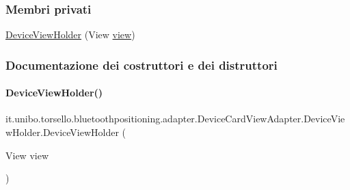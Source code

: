 \subsubsection*{Membri privati}
\begin{DoxyCompactItemize}
\item 
\hyperlink{classit_1_1unibo_1_1torsello_1_1bluetoothpositioning_1_1adapter_1_1DeviceCardViewAdapter_1_1DeviceViewHolder_a75016d2a0df1fc991a5a6aed86b776d2_a75016d2a0df1fc991a5a6aed86b776d2}{Device\+View\+Holder} (View \hyperlink{classit_1_1unibo_1_1torsello_1_1bluetoothpositioning_1_1adapter_1_1DeviceCardViewAdapter_1_1DeviceViewHolder_a4aa2da965bbcbc091ae913aea1e0a5cd_a4aa2da965bbcbc091ae913aea1e0a5cd}{view})
\end{DoxyCompactItemize}


\subsubsection{Documentazione dei costruttori e dei distruttori}
\hypertarget{classit_1_1unibo_1_1torsello_1_1bluetoothpositioning_1_1adapter_1_1DeviceCardViewAdapter_1_1DeviceViewHolder_a75016d2a0df1fc991a5a6aed86b776d2_a75016d2a0df1fc991a5a6aed86b776d2}{}\label{classit_1_1unibo_1_1torsello_1_1bluetoothpositioning_1_1adapter_1_1DeviceCardViewAdapter_1_1DeviceViewHolder_a75016d2a0df1fc991a5a6aed86b776d2_a75016d2a0df1fc991a5a6aed86b776d2} 
\paragraph{\texorpdfstring{Device\+View\+Holder()}{DeviceViewHolder()}}
{\footnotesize\ttfamily it.\+unibo.\+torsello.\+bluetoothpositioning.\+adapter.\+Device\+Card\+View\+Adapter.\+Device\+View\+Holder.\+Device\+View\+Holder (\begin{DoxyParamCaption}\item[{View}]{view }\end{DoxyParamCaption})\hspace{0.3cm}{\ttfamily [private]}}


